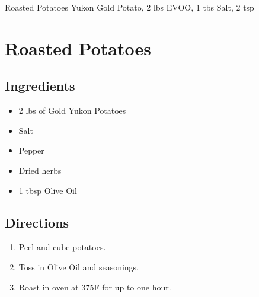 Roasted Potatoes
  Yukon Gold Potato, 2 lbs
  EVOO, 1 tbs
  Salt, 2 tsp

\section{Roasted Potatoes}

\subsection{ Ingredients }

\begin{itemize}
  \item 2 lbs of Gold Yukon Potatoes
  \item Salt
  \item Pepper
  \item Dried herbs
  \item 1 tbsp Olive Oil
\end{itemize}

\subsection{ Directions }

\begin{enumerate}
  \item Peel and cube potatoes. 
  \item Toss in Olive Oil and seasonings. 
  \item Roast in oven at 375F for up to one hour. 
\end{enumerate}

